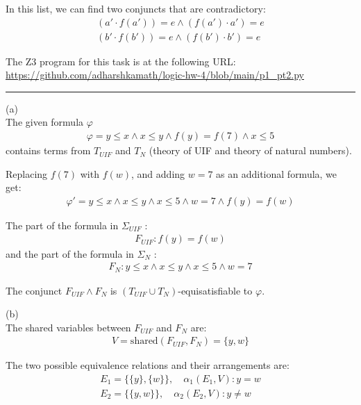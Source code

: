 \documentclass[12pt,letterpaper, onecolumn]{exam}
\newcommand{\link}[1]{{\color{blue}\href{#1}{#1}}}
\begin{document}
\begin{questions}
	In this list, we can find two conjuncts that are contradictory:
	\begin{align*}
		(a' \cdot f(a')) = e \land (f(a') \cdot a') = e \\
		(b' \cdot f(b')) = e \land (f(b') \cdot b') = e
	\end{align*}

	The Z3 program for this task is at the following URL:
	\link{https://github.com/adharshkamath/logic-hw-4/blob/main/p1\_pt2.py}


    {\rule{17cm}{0.4pt}}

	\question[]
	\solutiontitle

	(a) \\
	The given formula $ \varphi $
	\begin{align*}
		\varphi = y \le x \land x \le y \land f(y) = f(7) \land x \le 5
	\end{align*}
	contains terms from $ T_{UIF} $ and $ T_{N} $ (theory of UIF and theory of natural numbers).

	Replacing $ f(7) $ with $ f(w) $, and adding $ w= 7 $ as an additional formula, we get:
	\begin{align*}
		\varphi' = y \le x \land x \le y \land x \le 5 \land w = 7 \land f(y) = f(w) 
	\end{align*} 

	The part of the formula in $ \Sigma_{UIF} $ :
	\begin{align*}
		F_{UIF} : f(y) = f(w)
	\end{align*}
	and the part of the formula in $ \Sigma_{N} $ :
	\begin{align*}
		F_{N} : y \le x \land x \le y \land x \le 5 \land w = 7
	\end{align*}

	The conjunct $ F_{UIF} \land F_{N} $ is $(T_{UIF} \cup T_N)$-equisatisfiable to $ \varphi $.

	(b) \\
	The shared variables between $ F_{UIF} $ and $ F_{N} $ are:
	\begin{align*}
		V = \text{shared}(F_{UIF}, F_{N}) = \{y, w\}
	\end{align*}

	The two possible equivalence relations and their arrangements are:
	\begin{align*}
		E_1 = \{\{y\}, \{w\}\}, \quad \alpha_1(E_1, V) : y = w\\
		E_2 = \{\{y, w\}\}, \quad \alpha_2(E_2, V) : y \neq w
	\end{align*}


\end{questions}
\end{document}

